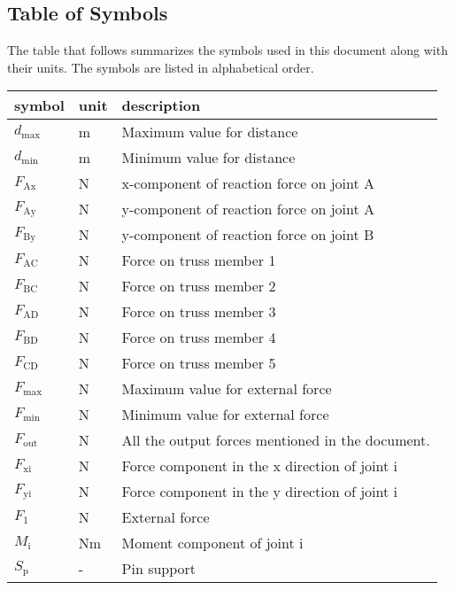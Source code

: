 \documentclass[12pt]{article}
\begin{document}
\subsection{Table of Symbols}

The table that follows summarizes the symbols used in this document along with
their units. The symbols are listed in alphabetical order.

\renewcommand{\arraystretch}{1.2}
\noindent \begin{longtable*}{l l p{12cm}} \toprule
\textbf{symbol} & \textbf{unit} & \textbf{description}\\
\midrule 
$d_{\text{max}}$ & \si{\metre} & Maximum value for distance \\
$d_{\text{min}}$ & \si{\metre} & Minimum value for distance \\
$F_\text{Ax}$ & \si{\newton} & x-component of reaction force on joint A \\
$F_\text{Ay}$ & \si{\newton} & y-component of reaction force on joint A \\ 
$F_\text{By}$ & \si{\newton} & y-component of reaction force on joint B \\
$F_\text{AC}$ & \si{\newton} & Force on truss member 1 \\
$F_\text{BC}$ & \si{\newton} & Force on truss member 2 \\
$F_\text{AD}$ & \si{\newton} & Force on truss member 3 \\
$F_\text{BD}$ & \si{\newton} & Force on truss member 4 \\
$F_\text{CD}$ & \si{\newton} & Force on truss member 5 \\
$F_{\text{max}}$ & \si{\newton} & Maximum value for external force \\
$F_{\text{min}}$ & \si{\newton} & Minimum value for external force \\
$F_\text{out}$ & \si{\newton} & All the output forces mentioned in the 
document. \\
$F_\text{xi}$ & \si{\newton} & Force component in the x direction of joint i \\
$F_\text{yi}$ & \si{\newton} & Force component in the y direction of joint i \\
$F_\text{1}$ & \si{\newton} & External force \\
$M_\text{i}$ & \si{\newton}\si{\metre} & Moment component of joint i \\
$S_\text{p}$ & - & Pin support \\

\end{longtable*}
\end{document}
